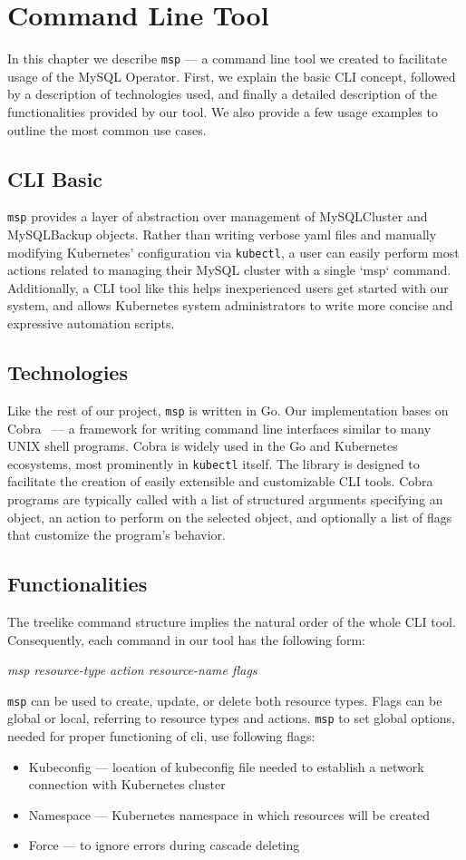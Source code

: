 \chapter{Command Line Tool}
In this chapter we describe \texttt{msp} --- a command line tool we created to facilitate usage of the MySQL Operator. First, we explain the basic CLI concept, followed by a description of technologies used, and finally a detailed description of the functionalities provided by our tool. We also provide a few usage examples to outline the most common use cases.

\section{CLI Basic}
\texttt{msp} provides a layer of abstraction over management of MySQLCluster and MySQLBackup objects. Rather than writing verbose yaml files and manually modifying Kubernetes’ configuration via \texttt{kubectl}, a user can easily perform most actions related to managing their MySQL cluster with a single `msp` command. Additionally, a CLI tool like this helps inexperienced users get started with our system, and allows Kubernetes system administrators to write more concise and expressive automation scripts.

\section{Technologies}
Like the rest of our project, \texttt{msp} is written in Go. Our implementation bases on Cobra~\cite{cobra} --- a framework for writing command line interfaces similar to many UNIX shell programs. Cobra is widely used in the Go and Kubernetes ecosystems, most prominently in \texttt{kubectl} itself. The library is designed to facilitate the creation of easily extensible and customizable CLI tools.
Cobra programs are typically called with a list of structured arguments specifying an object, an action to perform on the selected object, and optionally a list of flags that customize the program’s behavior. 

\section{Functionalities}
The treelike command structure implies the natural order of the whole CLI tool. Consequently, each command in our tool has the following form: \\ 
\centerline{\textit{msp resource-type action resource-name flags}}
\texttt{msp} can be used to create, update, or delete both resource types. Flags can be global or local, referring to resource types and actions. \texttt{msp} to set global options, needed for proper functioning of cli,  use following flags:
\begin{itemize}
	\item Kubeconfig --- location of kubeconfig file needed to establish a network connection with Kubernetes cluster
	\item Namespace --- Kubernetes namespace in which resources will be created
	\item Force --- to ignore errors during cascade deleting
\end{itemize}


